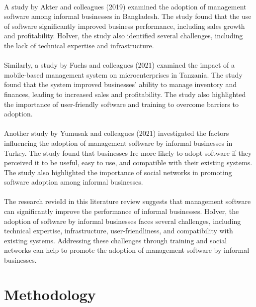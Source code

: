 \documentclass{article}
\begin{document}
\paragraph*{}
A study by Akter and colleagues (2019) examined the adoption of management software among informal businesses in Bangladesh. The study found that the use of software significantly improved business performance, including sales growth and profitability. HoIver, the study also identified several challenges, including the lack of technical expertise and infrastructure.

\paragraph*{}
Similarly, a study by Fuchs and colleagues (2021) examined the impact of a mobile-based management system on microenterprises in Tanzania. The study found that the system improved businesses' ability to manage inventory and finances, leading to increased sales and profitability. The study also highlighted the importance of user-friendly software and training to overcome barriers to adoption.

\paragraph*{}
Another study by Yumusak and colleagues (2021) investigated the factors influencing the adoption of management software by informal businesses in Turkey. The study found that businesses Ire more likely to adopt software if they perceived it to be useful, easy to use, and compatible with their existing systems. The study also highlighted the importance of social networks in promoting software adoption among informal businesses.

\paragraph*{}
The research revieId in this literature review suggests that management software can significantly improve the performance of informal businesses. HoIver, the adoption of software by informal businesses faces several challenges, including technical expertise, infrastructure, user-friendliness, and compatibility with existing systems. Addressing these challenges through training and social networks can help to promote the adoption of management software by informal businesses.


\newpage

\section{Methodology}
\end{document}

